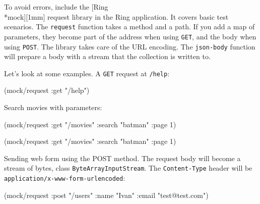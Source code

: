 \fi


To avoid errors, include the [Ring\\*mock][1mm] request library in the Ring application. It covers basic test scenarios. The \verb|request| function takes a method and a path. If you add a map of parameters, they become part of the address when using \verb|GET|, and the body when using \verb|POST|. The library takes care of the URL encoding. The \verb|json-body| function will prepare a body with a stream that the collection is written to.

Let's look at some examples. A \verb|GET| request at \verb|/help|:

\begin{english}
  \begin{clojure}
(mock/request :get "/help")
  \end{clojure}
\end{english}

\noindent
Search movies with parameters:

\ifx\DEVICETYPE\MOBILE

\begin{english}
  \begin{clojure}
(mock/request :get "/movies"
  {:search "batman" :page 1})
  \end{clojure}
\end{english}

\else

\begin{english}
  \begin{clojure}
(mock/request :get "/movies" {:search "batman" :page 1})
  \end{clojure}
\end{english}

\fi


\noindent
Sending web form using the POST method. The request body will become a stream of bytes, class \texttt{ByteArrayInput\-Stream}. The \verb|Content-Type| header will be \verb|application/x-www-form-urlencoded|:

\ifx\DEVICETYPE\MOBILE

\begin{english}
  \begin{clojure}
(mock/request :post "/users"
  {:name "Ivan" :email "test@test.com"})
  \end{clojure}
\end{english}

